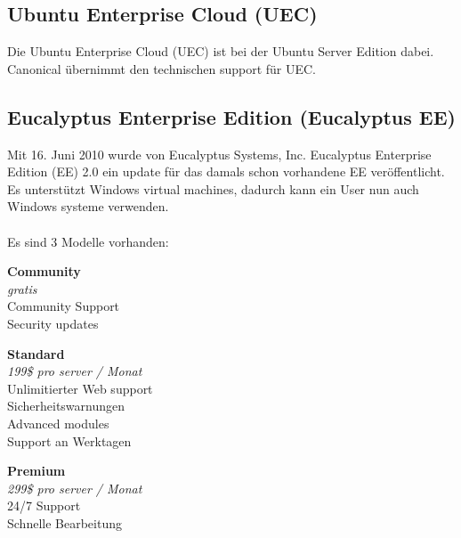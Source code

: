 \documentclass[a4paper,nochapterprefix,english,12pt]{scrreprt}
\begin{document}
\subsection{Ubuntu Enterprise Cloud (UEC)}
Die Ubuntu Enterprise Cloud (UEC) ist bei der Ubuntu Server Edition dabei. Canonical übernimmt den technischen support für UEC. \cite{EucalyptusBegGuide}
\subsection{Eucalyptus Enterprise Edition (Eucalyptus EE)}
Mit 16. Juni 2010 wurde von  Eucalyptus Systems, Inc. Eucalyptus Enterprise Edition (EE) 2.0 ein update für das damals schon vorhandene EE veröffentlicht. Es unterstützt Windows virtual machines, dadurch kann ein User nun auch Windows systeme verwenden. \cite{EucalyptusEELaunch}\\ \\
Es sind 3 Modelle vorhanden: \\
\begin{minipage}[t]{.2\textwidth}
\textbf{Community} \\
\textit{gratis} \\
Community Support\\
Security updates
\end{minipage}
\begin{minipage}[t]{.05\textwidth}
\hspace{1.0\textwidth}
\end{minipage}
\begin{minipage}[t]{.3\textwidth}
\textbf{Standard} \\
\textit{199\$ pro server / Monat} \\
Unlimitierter Web support \\
Sicherheitswarnungen \\
Advanced modules \\
Support an Werktagen
\end{minipage}
\begin{minipage}[t]{.05\textwidth}
\hspace{1.0\textwidth}
\end{minipage}
\begin{minipage}[t]{.3\textwidth}
\textbf{Premium} \\
\textit{299\$ pro server / Monat} \\
24/7 Support \\
Schnelle Bearbeitung
\end{minipage}
\\
\cite{EucalyptusPric}
\end{document}
